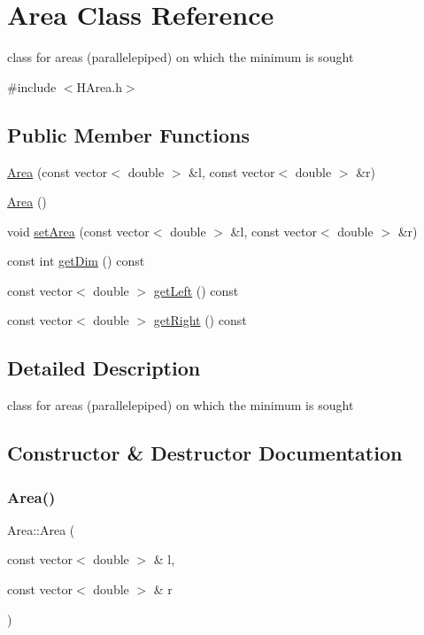 \hypertarget{class_area}{}\section{Area Class Reference}
\label{class_area}


class for areas (parallelepiped) on which the minimum is sought  




{\ttfamily \#include $<$H\+Area.\+h$>$}

\subsection*{Public Member Functions}
\begin{DoxyCompactItemize}
\item 
\hyperlink{class_area_ab59b0c1700cfeedcc20e59f70a6a3ee8}{Area} (const vector$<$ double $>$ \&l, const vector$<$ double $>$ \&r)
\item 
\hyperlink{class_area_aa92851fcffb0a9f1c6c8c283204f7003}{Area} ()
\item 
void \hyperlink{class_area_ad1807b8ed5bb2e91a910b7f822fc5f27}{set\+Area} (const vector$<$ double $>$ \&l, const vector$<$ double $>$ \&r)
\item 
const int \hyperlink{class_area_a3f323d5ea2bb19a1a48e9462a9542ff4}{get\+Dim} () const
\item 
const vector$<$ double $>$ \hyperlink{class_area_a785a940f36dc9fcecde27c7ccf11f297}{get\+Left} () const
\item 
const vector$<$ double $>$ \hyperlink{class_area_a9579ee04ce26f73eb35be4a03037972b}{get\+Right} () const
\end{DoxyCompactItemize}


\subsection{Detailed Description}
class for areas (parallelepiped) on which the minimum is sought 

\subsection{Constructor \& Destructor Documentation}
\mbox{\label{class_area_ab59b0c1700cfeedcc20e59f70a6a3ee8}} 
\subsubsection{\texorpdfstring{Area()}{Area()}\hspace{0.1cm}{\footnotesize\ttfamily [1/2]}}
{\footnotesize\ttfamily Area\+::\+Area (\begin{DoxyParamCaption}\item[{const vector$<$ double $>$ \&}]{l,  }\item[{const vector$<$ double $>$ \&}]{r }\end{DoxyParamCaption})\hspace{0.3cm}{\ttfamily [inline]}}

